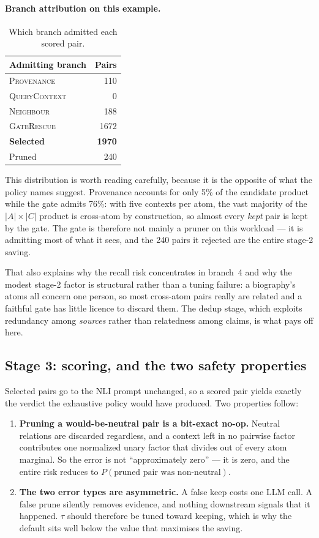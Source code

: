 \documentclass[11pt]{article}
\begin{document}
\paragraph{Branch attribution on this example.}
\begin{table}[htbp]
\centering
\begin{tabular}{lr}
\toprule
Admitting branch & Pairs \\
\midrule
\textsc{Provenance} & 110 \\
\textsc{QueryContext} & 0 \\
\textsc{Neighbour} & 188 \\
\textsc{GateRescue} & 1672 \\
\midrule
\textbf{Selected} & \textbf{1970} \\
Pruned & 240 \\
\bottomrule
\end{tabular}
\caption{Which branch admitted each scored pair.}
\label{tab:branches}
\end{table}

This distribution is worth reading carefully, because it is the opposite of what the policy names suggest. Provenance accounts for only 5\% of the candidate product while the gate admits 76\%: with five contexts per atom, the vast majority of the $|A| \times |C|$ product is cross-atom by construction, so almost every \emph{kept} pair is kept by the gate. The gate is therefore not mainly a pruner on this workload --- it is admitting most of what it sees, and the 240 pairs it rejected are the entire stage-2 saving.

That also explains why the recall risk concentrates in branch~4 and why the modest stage-2 factor is structural rather than a tuning failure: a biography's atoms all concern one person, so most cross-atom pairs really are related and a faithful gate has little licence to discard them. The dedup stage, which exploits redundancy among \emph{sources} rather than relatedness among claims, is what pays off here.

\subsection{Stage 3: scoring, and the two safety properties}
Selected pairs go to the NLI prompt unchanged, so a scored pair yields exactly the verdict the exhaustive policy would have produced. Two properties follow:
\begin{enumerate}
  \item \textbf{Pruning a would-be-neutral pair is a bit-exact no-op.} Neutral relations are discarded regardless, and a context left in no pairwise factor contributes one normalized unary factor that divides out of every atom marginal. So the error is not ``approximately zero'' --- it is zero, and the entire risk reduces to $P(\text{pruned pair was non-neutral})$.
  \item \textbf{The two error types are asymmetric.} A false keep costs one LLM call. A false prune silently removes evidence, and nothing downstream signals that it happened. $\tau$ should therefore be tuned toward keeping, which is why the default sits well below the value that maximises the saving.
\end{enumerate}
\end{document}
